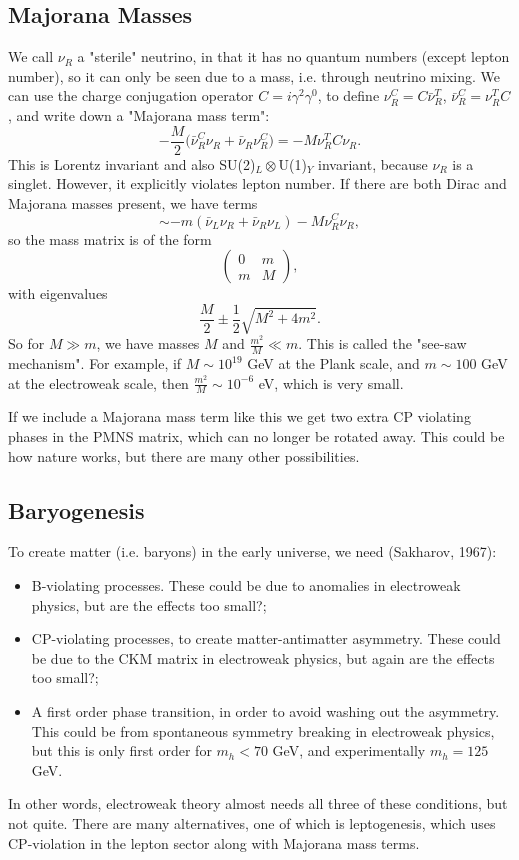 \subsection{Majorana Masses}
We call $\nu_R$ a "sterile" neutrino, in that it has no quantum numbers (except lepton number), so it can only be seen due to a mass, i.e. through neutrino mixing. We can use the charge conjugation operator $C=i \gamma^2 \gamma^0$, to define $\nu_R^C = C\bar{\nu}_R^T$, $\bar{\nu}_R^C = \nu_R^T C$, and write down a "Majorana mass term":
\begin{equation}
-\frac{M}{2}\bigg( \bar{\nu}_R^C \nu_R + \bar{\nu}_R \nu_R^C \bigg) = -M \nu_R^T C \nu_R.
\end{equation}
This is Lorentz invariant and also SU(2)$_L \otimes$U(1)$_Y$ invariant, because $\nu_R$ is a singlet. However, it explicitly violates lepton number. If there are both Dirac and Majorana masses present, we have terms
\begin{equation}
\sim -m(\bar{\nu}_L\nu_R + \bar{\nu}_R \nu_L) - M \nu_R^C \nu_R,
\end{equation}
so the mass matrix is of the form
\begin{equation}
\begin{pmatrix}
0 & m \\
m & M
\end{pmatrix},
\end{equation}
with eigenvalues
\begin{equation}
\frac{M}{2} \pm \frac{1}{2} \sqrt{M^2 + 4m^2}.
\end{equation}
So for $M \gg m$, we have masses $M$ and $\frac{m^2}{M} \ll m$. This is called the "see-saw mechanism". For example, if $M \sim 10^{19}$ GeV at the Plank scale, and $m \sim 100$ GeV at the electroweak scale, then $\frac{m^2}{M} \sim 10^{-6}$ eV, which is very small.

If we include a Majorana mass term like this we get two extra CP violating phases in the PMNS matrix, which can no longer be rotated away. This could be how nature works, but there are many other possibilities. 
\subsection{Baryogenesis}
To create matter (i.e. baryons) in the early universe, we need (Sakharov, 1967):
\begin{itemize}
\item B-violating processes. These could be due to anomalies in electroweak physics, but are the effects too small?;
\item CP-violating processes, to create matter-antimatter asymmetry. These could be due to the CKM matrix in electroweak physics, but again are the effects too small?;
\item A first order phase transition, in order to avoid washing out the asymmetry. This could be from spontaneous symmetry breaking in electroweak physics, but this is only first order for $m_h < 70$ GeV, and experimentally $m_h = 125$ GeV.
\end{itemize}
In other words, electroweak theory almost needs all three of these conditions, but not quite. There are many alternatives, one of which is leptogenesis, which uses CP-violation in the lepton sector along with Majorana mass terms.